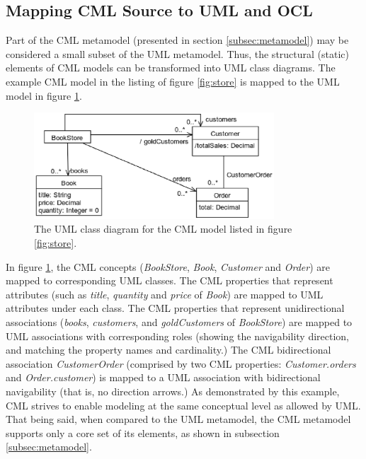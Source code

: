 \subsection{Mapping CML Source to UML and OCL}\label{subsec:mapping}

Part of the CML metamodel (presented in section \ref{subsec:metamodel})
may be considered a small subset of the UML  \cite{uml} metamodel.
Thus, the structural (static) elements of CML models can be transformed into UML class diagrams.
The example CML model in the listing of figure \ref{fig:store} is mapped to the UML model in figure \ref{fig:uml}.

\begin{figure}
\centering
\includegraphics[width=0.8\textwidth]{language/diagram-uml}
\caption{The UML class diagram \cite{uml} for the CML model listed in figure \ref{fig:store}.}
\label{fig:uml}
\end{figure}

In figure \ref{fig:uml},
the CML concepts (\emph{BookStore}, \emph{Book}, \emph{Customer} and \emph{Order})
are mapped to corresponding UML classes.
The CML properties that represent attributes
(such as \emph{title}, \emph{quantity} and \emph{price} of \emph{Book})
are mapped to UML attributes under each class.
The CML properties that represent unidirectional associations
(\emph{books}, \emph{customers}, and \emph{goldCustomers} of \emph{BookStore})
are mapped to UML associations with corresponding roles
(showing the navigability direction, and matching the property names and cardinality.)
The CML bidirectional association \emph{CustomerOrder}
(comprised by two CML properties: \emph{Customer.orders} and \emph{Order.customer})
is mapped to a UML association with bidirectional navigability (that is, no direction arrows.)
As demonstrated by this example,
CML strives to enable modeling at the same conceptual level as allowed by UML.
That being said, when compared to the UML metamodel,
the CML metamodel supports only a core set of its elements,
as shown in subsection \ref{subsec:metamodel}.

